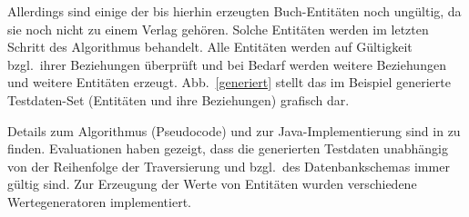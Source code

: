 %
%
Allerdings sind einige der bis hierhin erzeugten Buch-Entitäten noch ungültig, da sie noch nicht zu einem Verlag gehören.
%
Solche Entitäten werden im letzten Schritt des Algorithmus behandelt. Alle Entitäten werden auf Gültigkeit bzgl.~ihrer Beziehungen überprüft und bei Bedarf werden weitere Beziehungen und weitere Entitäten erzeugt.
%
Abb.~\ref{generiert} stellt das im Beispiel generierte Testdaten-Set (Entitäten und ihre Beziehungen) grafisch dar. 
%
%
	
		
Details zum Algorithmus (Pseudocode) und zur Java-Implementierung sind in \cite{MT:Moll:2013} zu finden.
%
Evaluationen haben gezeigt, dass die generierten Testdaten unabhängig von der Reihenfolge der Traversierung und  bzgl.~des Datenbankschemas immer gültig sind.
%
Zur Erzeugung der Werte von Entitäten wurden verschiedene Wertegeneratoren implementiert.	

	
	

